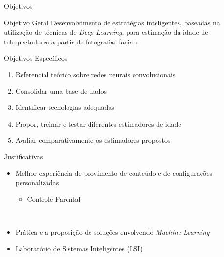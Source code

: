 \begin{frame}{Objetivos}
   \ \  \\[0.1cm]
  \begin{block}{Objetivo Geral}
  Desenvolvimento de estratégias inteligentes, baseadas na utilização de técnicas de \emph{Deep Learning}, para estimação da idade de telespectadores a partir de fotografias faciais
  \end{block}
  \pause
  \begin{block}{Objetivos Específicos}
    \begin{enumerate}
      \item Referencial teórico sobre redes neurais convolucionais
      \item Consolidar uma base de dados
      \item Identificar tecnologias adequadas
      \item Propor, treinar e testar diferentes estimadores de idade
      \item Avaliar comparativamente os estimadores propostos

    \end{enumerate}
  \end{block}


\end{frame}

\begin{frame}{Justificativas}
  \begin{itemize}
  \item Melhor experiência de provimento de conteúdo e de configurações personalizadas
  \begin{itemize}
    \item Controle Parental
  \end{itemize}
  \ \ \newline
  \item Prática e a proposição de soluções envolvendo \emph{Machine Learning}
  \ \ \newline
  \item Laboratório de Sistemas Inteligentes (LSI)
\end{itemize}
\end{frame}

